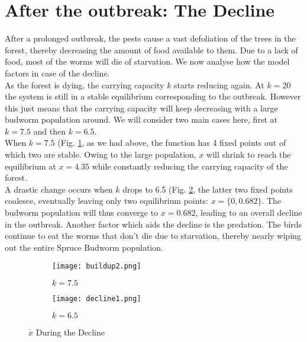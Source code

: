 \documentclass{article}
\begin{document}
\section{After the outbreak: The Decline}
After a prolonged outbreak, the pests cause a vast defoliation of the trees in the forest, thereby decreasing the amount of food available to them. Due to a lack of food, most of the worms will die of starvation. We now analyse how the model factors in case of the decline.\\
As the forest is dying, the carrying capacity $k$ starts reducing again. At $k=20$ the system is still in a stable equilibrium corresponding to the outbreak. However this just means that the carrying capacity will keep decreasing with a large budworm population around. We will consider two main cases here, first at $k=7.5$ and then $k=6.5$.\\
When $k=7.5$ (Fig. \ref{fig:d1}, as we had above, the function has 4 fixed points out of which two are stable. Owing to the large population, $x$ will shrink to reach the equilibrium at $x=4.35$ while constantly reducing the carrying capacity of the forest.\\
A drastic change occurs when $k$ drops to 6.5 (Fig. \ref{fig:d2}, the latter two fixed points coalesce, eventually leaving only two equilibrium points: $x=\{0, 0.682\}$. The budworm population will thus converge to $x=0.682$, leading to an overall decline in the outbreak. Another factor which aids the decline is the predation. The birds continue to eat the worms that don't die due to starvation, thereby nearly wiping out the entire Spruce Budworm population.


\begin{figure}[H]
     \centering
     \begin{subfigure}[b]{0.4\textwidth}
         \centering
         \texttt{[image: buildup2.png]}
         \caption{$k=7.5$}
         \label{fig:d1}
     \end{subfigure}
     \begin{subfigure}[b]{0.4\textwidth}
         \centering
         \texttt{[image: decline1.png]}
         \caption{$k=6.5$}
         \label{fig:d2}
     \end{subfigure}
             \caption{$\dot{x}$ During the Decline}
        \label{fig:decline}
\end{figure}
\end{document}
